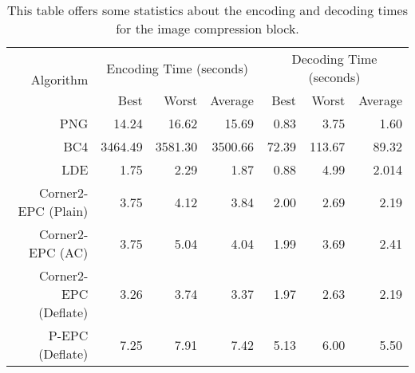 \documentclass{article}
\begin{document}
\bigskip

\begin{table}
\caption{This table offers some statistics about the encoding and decoding 
times for the image compression block.}
\begin{center}
\begin{tabular}{ r r r r r r r }
\hline \hline
\multirow{2}{*}{Algorithm}
&\multicolumn{3}{c}{Encoding Time (seconds)}
&\multicolumn{3}{c}{Decoding Time (seconds)}\\
\cline{2-7}
 & Best & Worst & Average & Best & Worst & Average 
\tabularnewline
\hline
PNG & 14.24 & 16.62 & 15.69 & 0.83 & 3.75 & 1.60 
\tabularnewline
BC4 & 3464.49 & 3581.30 & 3500.66 & 72.39 & 113.67 & 89.32 
\tabularnewline
LDE & 1.75 & 2.29 & 1.87 & 0.88 & 4.99 & 2.014 
\tabularnewline
Corner2-EPC (Plain) & 3.75 & 4.12 & 3.84 & 2.00 & 2.69 & 2.19 
\tabularnewline
Corner2-EPC (AC) & 3.75 & 5.04 & 4.04 & 1.99 & 3.69 & 2.41 
\tabularnewline
Corner2-EPC (Deflate) & 3.26 & 3.74 & 3.37 & 1.97 & 2.63 & 2.19 
\tabularnewline
P-EPC (Deflate) & 7.25 & 7.91 & 7.42 & 5.13 & 6.00 & 5.50 
\tabularnewline
\hline \hline
\end{tabular}
\end{center}
\end{table}

\bigskip
\end{document}
